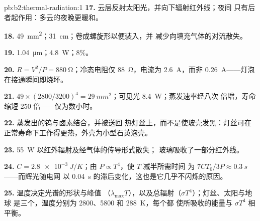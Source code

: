 \begin{solution}{pb:b2:thermal-radiation:1}
\textbf{17.} 云层反射太阳光，并向下辐射红外线；夜间
只有后者起作用：多云的夜晚更暖和。

\textbf{18.} \qty{49}{mm^2}；\qty{31}{cm}；卷成螺旋形以便装入，并
减少向填充气体的对流散失。

\textbf{19.} \qty{1.04}{\micro m}；\qty{4.8}{W}；$8\%$。

\textbf{20.} $R = V^2/P = \qty{880}{\ohm}$；冷态电阻仅 \qty{88}{\ohm}，电流为
\qty{2.6}{A}，而非 \qty{0.26}{A}——灯泡在接通瞬间即烧坏。

\textbf{21.} $49 \times (2800/3200)^4 = \qty{29}{mm^2}$；可见光 \qty{8.4}{W}；蒸发速率经八次
倍增，寿命缩短 $250$ 倍——仅为数小时。

\textbf{22.} 蒸发出的钨与卤素结合，并被送回
热灯丝上，而不是使玻壳发黑：灯丝可在
正常寿命下工作得更热，外壳为小型石英泡壳。

\textbf{23.} \qty{55}{W} 以红外辐射及经气体的传导形式散失；
玻璃吸收了一部分红外线。

\textbf{24.} $C = \qty{2.8e-3}{J/K}$；由 $P \propto T^4$，使 $T$ 减半所需时间
为 $7CT_0/3P \approx \qty{0.3}{s}$——而辉光随电网
以 \qty{0.04}{s} 的滞后变化，这也是它几乎不闪烁的原因。

\textbf{25.} 温度决定光谱的形状与峰值
（$\lambda_{\max}T$），以及总辐射（$\sigma T^4$）；灯丝、太阳与地球
是三个，温度分别为 \qty{2800}{}、\qty{5800}{} 和 \qty{288}{K}，每个都
使所吸收的能量与 $\sigma T^4$ 相平衡。
\end{solution}
